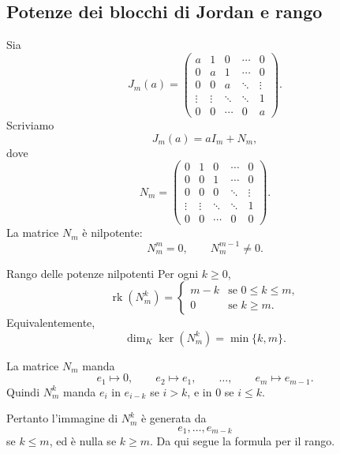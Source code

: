 \documentclass[a4paper]{article}
\begin{document}
\subsection{Potenze dei blocchi di Jordan e rango}

\begin{radioactive}
Sia
\[
    J_m(a)=
    \begin{pmatrix}
        a & 1 & 0 & \cdots & 0\\
        0 & a & 1 & \cdots & 0\\
        0 & 0 & a & \ddots & \vdots\\
        \vdots & \vdots & \ddots & \ddots & 1\\
        0 & 0 & \cdots & 0 & a
    \end{pmatrix}.
\]
Scriviamo
\[
    J_m(a)=aI_m+N_m,
\]
dove
\[
    N_m=
    \begin{pmatrix}
        0 & 1 & 0 & \cdots & 0\\
        0 & 0 & 1 & \cdots & 0\\
        0 & 0 & 0 & \ddots & \vdots\\
        \vdots & \vdots & \ddots & \ddots & 1\\
        0 & 0 & \cdots & 0 & 0
    \end{pmatrix}.
\]
La matrice \(N_m\) è nilpotente:
\[
    N_m^m=0,
    \qquad
    N_m^{m-1}\neq 0.
\]
\end{radioactive}

\begin{radioactive}
\begin{snippetproposition}{Rango delle potenze nilpotenti}
    Per ogni \(k\geq 0\),
    \[
        \operatorname{rk}(N_m^k)=
        \begin{cases}
            m-k & \text{se } 0\leq k\leq m,\\
            0 & \text{se } k\geq m.
        \end{cases}
    \]
    Equivalentemente,
    \[
        \dim_K\ker(N_m^k)=\min\{k,m\}.
    \]
\end{snippetproposition}
\end{radioactive}

\begin{radioactive}
\begin{snippetproof}{}
    La matrice \(N_m\) manda
    \[
        e_1\mapsto 0,
        \qquad
        e_2\mapsto e_1,
        \qquad
        \ldots,
        \qquad
        e_m\mapsto e_{m-1}.
    \]
    Quindi \(N_m^k\) manda \(e_i\) in \(e_{i-k}\) se \(i>k\), e in \(0\) se \(i\leq k\).

    Pertanto l'immagine di \(N_m^k\) è generata da
    \[
        e_1,\ldots,e_{m-k}
    \]
    se \(k\leq m\), ed è nulla se \(k\geq m\).
    Da qui segue la formula per il rango.
\end{snippetproof}
\end{radioactive}
\end{document}
